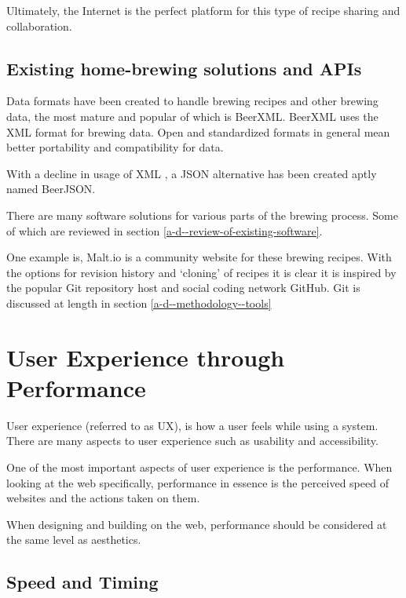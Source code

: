Ultimately, the Internet is the perfect platform for this type of recipe sharing and collaboration.

\subsection{Existing home-brewing solutions and APIs} \label{l-r--exisiting-home-brewing-solutions}

Data formats have been created to handle brewing recipes and other brewing data, the most mature and popular of which is BeerXML. BeerXML uses the XML format for brewing data. \cite{beerxml} Open and standardized formats in general mean better portability and compatibility for data.

With a decline in usage of XML \cite{jsonxml}, a JSON alternative has been created aptly named BeerJSON. \cite{beerjson}

There are many software solutions for various parts of the brewing process. Some of which are reviewed in section \ref{a-d--review-of-existing-software}.

One example is, Malt.io is a community website for these brewing recipes. With the options for revision history and `cloning' of recipes it is clear it is inspired by the popular Git repository host and social coding network GitHub. \cite{malt.io} Git is discussed at length in section \ref{a-d--methodology--tools}

\section{User Experience through Performance} \label{l-r--user-experience-performance}

User experience (referred to as UX), is how a user feels while using a system. There are many aspects to user experience such as usability and accessibility. \cite{what_is_ux}

One of the most important aspects of user experience is the performance. When looking at the web specifically, performance in essence is the perceived speed of websites and the actions taken on them.

When designing and building on the web, performance should be considered at the same level as aesthetics. \cite{performance_is_ux}

\subsection{Speed and Timing} \label{l-r--speed}


